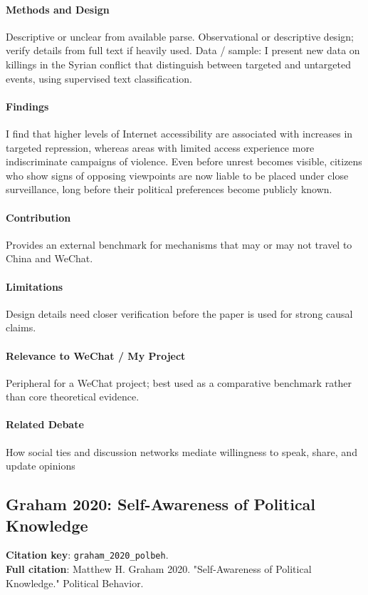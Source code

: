 \documentclass[12pt]{article}
\begin{document}
\paragraph{Methods and Design} Descriptive or unclear from available parse. Observational or descriptive design; verify details from full text if heavily used. Data / sample: I present new data on killings in the Syrian conflict that distinguish between targeted and untargeted events, using supervised text classification.

\paragraph{Findings} I find that higher levels of Internet accessibility are associated with increases in targeted repression, whereas areas with limited access experience more indiscriminate campaigns of violence. Even before unrest becomes visible, citizens who show signs of opposing viewpoints are now liable to be placed under close surveillance, long before their political preferences become publicly known.

\paragraph{Contribution} Provides an external benchmark for mechanisms that may or may not travel to China and WeChat.

\paragraph{Limitations} Design details need closer verification before the paper is used for strong causal claims.

\paragraph{Relevance to WeChat / My Project} Peripheral for a WeChat project; best used as a comparative benchmark rather than core theoretical evidence.

\paragraph{Related Debate} How social ties and discussion networks mediate willingness to speak, share, and update opinions


\subsection{Graham 2020: Self-Awareness of Political Knowledge}
\textbf{Citation key}: \texttt{graham\_2020\_polbeh}.\\
\textbf{Full citation}: Matthew H. Graham 2020. "Self-Awareness of Political Knowledge." Political Behavior.
\end{document}

